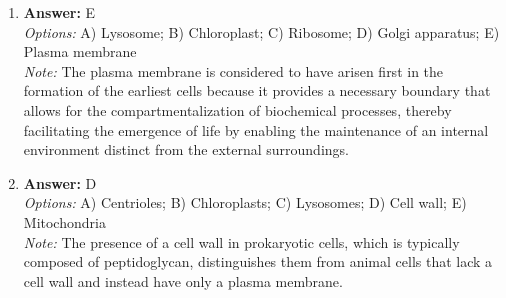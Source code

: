 \documentclass[12pt]{article}
\begin{document}
\begin{enumerate}[label=\arabic*.]
\item \textbf{Answer:} E
\\ \textit{Options:} A) Lysosome; B) Chloroplast; C) Ribosome; D) Golgi apparatus; E) Plasma membrane
\\ \textit{Note:} The plasma membrane is considered to have arisen first in the formation of the earliest cells because it provides a necessary boundary that allows for the compartmentalization of biochemical processes, thereby facilitating the emergence of life by enabling the maintenance of an internal environment distinct from the external surroundings.
\item \textbf{Answer:} D
\\ \textit{Options:} A) Centrioles; B) Chloroplasts; C) Lysosomes; D) Cell wall; E) Mitochondria
\\ \textit{Note:} The presence of a cell wall in prokaryotic cells, which is typically composed of peptidoglycan, distinguishes them from animal cells that lack a cell wall and instead have only a plasma membrane.
\end{enumerate}
\end{document}
